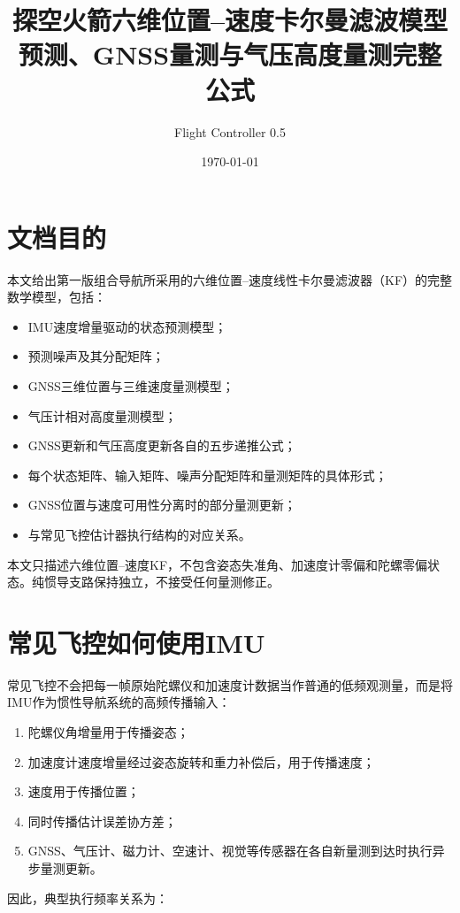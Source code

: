 \documentclass[12pt,a4paper]{ctexart}
\title{探空火箭六维位置--速度卡尔曼滤波模型\\
预测、GNSS量测与气压高度量测完整公式}
\author{Flight Controller 0.5}
\date{\today}
\begin{document}
\maketitle
\tableofcontents
\newpage

\section{文档目的}

本文给出第一版组合导航所采用的六维位置--速度线性卡尔曼滤波器（KF）的完整数学模型，包括：

\begin{itemize}[leftmargin=2em]
  \item IMU速度增量驱动的状态预测模型；
  \item 预测噪声及其分配矩阵；
  \item GNSS三维位置与三维速度量测模型；
  \item 气压计相对高度量测模型；
  \item GNSS更新和气压高度更新各自的五步递推公式；
  \item 每个状态矩阵、输入矩阵、噪声分配矩阵和量测矩阵的具体形式；
  \item GNSS位置与速度可用性分离时的部分量测更新；
  \item 与常见飞控估计器执行结构的对应关系。
\end{itemize}

本文只描述六维位置--速度KF，不包含姿态失准角、加速度计零偏和陀螺零偏状态。纯惯导支路保持独立，不接受任何量测修正。

\section{常见飞控如何使用IMU}

常见飞控不会把每一帧原始陀螺仪和加速度计数据当作普通的低频观测量，而是将IMU作为惯性导航系统的高频传播输入：

\begin{enumerate}[leftmargin=2em]
  \item 陀螺仪角增量用于传播姿态；
  \item 加速度计速度增量经过姿态旋转和重力补偿后，用于传播速度；
  \item 速度用于传播位置；
  \item 同时传播估计误差协方差；
  \item GNSS、气压计、磁力计、空速计、视觉等传感器在各自新量测到达时执行异步量测更新。
\end{enumerate}

因此，典型执行频率关系为：
\end{document}
